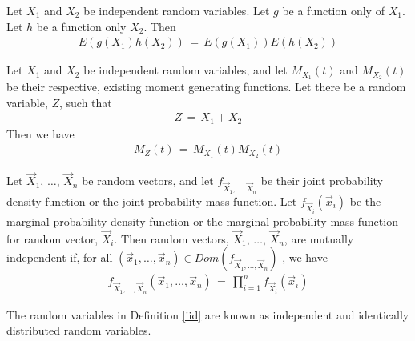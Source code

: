 \begin{theorem}
    Let $X_{1}$ and $X_{2}$ be independent random variables. Let $g$ be a function only of $X_{1}$. Let $h$ be a function only $X_{2}$. Then
    \begin{align*}
        E(g(X_{1}) h(X_{2})) \hspace{2pt} = \hspace{2pt} E(g(X_{1})) E(h(X_{2}))
    \end{align*}
\end{theorem}

\begin{theorem}
    Let $X_{1}$ and $X_{2}$ be independent random variables, and let $M_{X_{1}}(t)$ and $M_{X_{2}}(t)$ be their respective, existing moment generating functions. Let there be a random variable, $Z$, such that
    \begin{align*}
        Z \hspace{2pt} = \hspace{2pt} X_{1} + X_{2}
    \end{align*}
    Then we have
    \begin{align*}
        M_{Z}(t) \hspace{2pt} = \hspace{2pt} M_{X_{1}}(t) M_{X_{2}}(t)
    \end{align*}
\end{theorem}

\begin{definition}
    \label{iid}
    Let $\vec{X}_{1}$, $\dots$, $\vec{X}_{n}$ be random vectors, and let $f_{\vec{X}_{1}, \dots , \vec{X}_{n}}$ be their joint probability density function or the joint probability mass function. Let $f_{\vec{X}_{i}}(\vec{x}_{i})$ be the marginal probability density function or the marginal probability mass function for random vector, $\vec{X}_{i}$. Then random vectors, $\vec{X}_{1}$, $\dots$, $\vec{X}_{n}$, are mutually independent if, for all $(\vec{x}_{1}, \dots , \vec{x}_{n}) \in Dom(f_{\vec{X}_{1}, \dots , \vec{X}_{n}})$ , we have
    \begin{align*}
        f_{\vec{X}_{1}, \dots , \vec{X}_{n}}(\vec{x}_{1}, \dots , \vec{x}_{n}) \hspace{2pt} = \hspace{2pt} \prod_{i = 1}^{n} f_{\vec{X}_{i}}(\vec{x}_{i})
    \end{align*}
\end{definition}

The random variables in Definition \ref{iid} are known as independent and identically distributed random variables.

